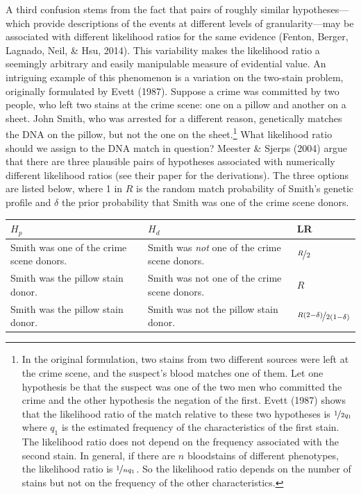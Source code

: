 \documentclass[
  10pt,
  dvipsnames,enabledeprecatedfontcommands]{scrartcl}
\begin{document}
A third confusion stems from the fact that pairs of roughly similar
hypotheses---which provide descriptions of the events at different
levels of granularity---may be associated with different likelihood
ratios for the same evidence (Fenton, Berger, Lagnado, Neil, \& Hsu,
2014). This variability makes the likelihood ratio a seemingly arbitrary
and easily manipulable measure of evidential value. An intriguing
example of this phenomenon is a variation on the two-stain problem,
originally formulated by Evett (1987). Suppose a crime was committed by
two people, who left two stains at the crime scene: one on a pillow and
another on a sheet. John Smith, who was arrested for a different reason,
genetically matches the DNA on the pillow, but not the one on the
sheet.\footnote{In the original formulation, two stains from two
  different sources were left at the crime scene, and the suspect's
  blood matches one of them. Let one hypothesis be that the suspect was
  one of the two men who committed the crime and the other hypothesis
  the negation of the first. Evett (1987) shows that the likelihood
  ratio of the match relative to these two hypotheses is
  \(\nicefrac{1}{2q_1}\) where \(q_1\) is the estimated frequency of the
  characteristics of the first stain. The likelihood ratio does not
  depend on the frequency associated with the second stain. In general,
  if there are \(n\) bloodstains of different phenotypes, the likelihood
  ratio is \(\nicefrac{1}{nq_1}\). So the likelihood ratio depends on
  the number of stains but not on the frequency of the other
  characteristics.} What likelihood ratio should we assign to the DNA
match in question? Meester \& Sjerps (2004) argue that there are three
plausible pairs of hypotheses associated with numerically different
likelihood ratios (see their paper for the derivations). The three
options are listed below, where 1 in \(R\) is the random match
probability of Smith's genetic profile and \(\delta\) the prior
probability that Smith was one of the crime scene donors. \vspace{2mm}

\begin{center}
    \footnotesize
    \begin{tabular}{@{}p{5cm}p{5cm}l@{}}
        \toprule
        $H_p$ & $H_d$  & LR \\ \midrule
        Smith was one of the crime scene donors.   &  Smith was \textit{not} one of the crime scene donors. & $\nicefrac{R}{2}$   \\
        Smith was the pillow stain donor.     & Smith was not one of the crime scene donors.& $R$\\
        Smith was the pillow stain donor. & Smith was not the pillow stain donor. &  $\nicefrac{R(2-\delta)}{2(1-\delta)}$
        \\ \bottomrule
    \end{tabular}
\end{center}
\normalsize
\vspace{2mm}
\end{document}
